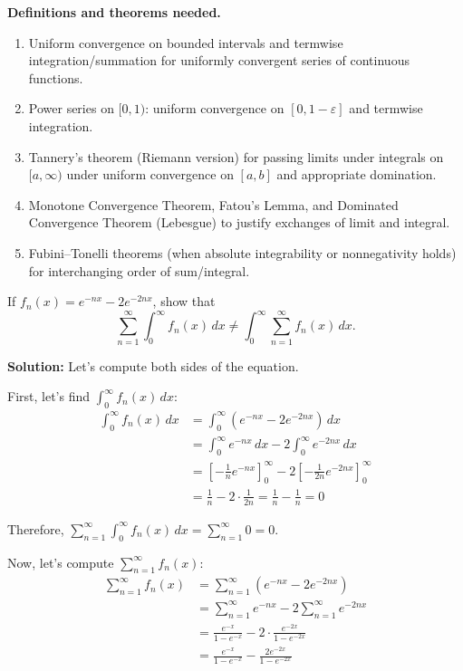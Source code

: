 \noindent\textbf{Definitions and theorems needed.}
\begin{enumerate}[label=(\alph*)]
    \item Uniform convergence on bounded intervals and termwise integration/summation for uniformly convergent series of continuous functions.
    \item Power series on $[0,1)$: uniform convergence on $[0,1-\varepsilon]$ and termwise integration.
    \item Tannery's theorem (Riemann version) for passing limits under integrals on $[a,\infty)$ under uniform convergence on $[a,b]$ and appropriate domination.
    \item Monotone Convergence Theorem, Fatou's Lemma, and Dominated Convergence Theorem (Lebesgue) to justify exchanges of limit and integral.
    \item Fubini–Tonelli theorems (when absolute integrability or nonnegativity holds) for interchanging order of sum/integral.
\end{enumerate}



\begin{problembox}
If $f_n(x) = e^{-nx} - 2e^{-2nx}$, show that 
\[\sum_{n=1}^{\infty} \int_{0}^{\infty} f_n(x) \, dx \neq \int_{0}^{\infty} \sum_{n=1}^{\infty} f_n(x) \, dx.\]
\end{problembox}

\bigskip\noindent\textbf{Solution:}
Let's compute both sides of the equation.

First, let's find $\int_{0}^{\infty} f_n(x) \, dx$:
\begin{align*}
\int_{0}^{\infty} f_n(x) \, dx &= \int_{0}^{\infty} (e^{-nx} - 2e^{-2nx}) \, dx \\
&= \int_{0}^{\infty} e^{-nx} \, dx - 2\int_{0}^{\infty} e^{-2nx} \, dx \\
&= \left[-\frac{1}{n}e^{-nx}\right]_{0}^{\infty} - 2\left[-\frac{1}{2n}e^{-2nx}\right]_{0}^{\infty} \\
&= \frac{1}{n} - 2 \cdot \frac{1}{2n} = \frac{1}{n} - \frac{1}{n} = 0
\end{align*}

Therefore, $\sum_{n=1}^{\infty} \int_{0}^{\infty} f_n(x) \, dx = \sum_{n=1}^{\infty} 0 = 0$.

Now, let's compute $\sum_{n=1}^{\infty} f_n(x)$:
\begin{align*}
\sum_{n=1}^{\infty} f_n(x) &= \sum_{n=1}^{\infty} (e^{-nx} - 2e^{-2nx}) \\
&= \sum_{n=1}^{\infty} e^{-nx} - 2\sum_{n=1}^{\infty} e^{-2nx} \\
&= \frac{e^{-x}}{1 - e^{-x}} - 2 \cdot \frac{e^{-2x}}{1 - e^{-2x}} \\
&= \frac{e^{-x}}{1 - e^{-x}} - \frac{2e^{-2x}}{1 - e^{-2x}}
\end{align*}

